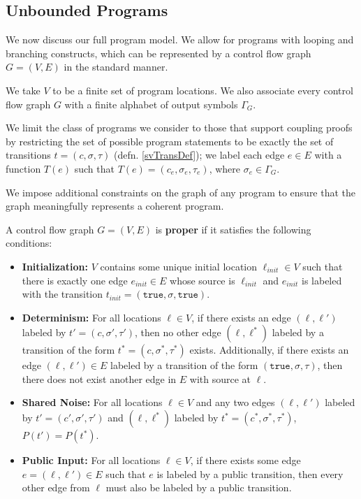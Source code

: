 
\subsection{Unbounded Programs}

We now discuss our full program model. We allow for programs with looping and branching constructs, which can be represented by a control flow graph $G = (V, E)$ in the standard manner. 

We take $V$ to be a finite set of program locations. We also associate every control flow graph $G$ with a finite alphabet of output symbols $\Gamma_G$.

We limit the class of programs we consider to those that support coupling proofs by restricting the set of possible program statements to be exactly the set of transitions $t = (c, \sigma, \tau)$ (defn. \ref{svTransDef}); we label each edge $e\in E$ with a function $T(e)$ such that $T(e) = (c_e, \sigma_e, \tau_e)$, where $\sigma_e \in \Gamma_G$. 

We impose additional constraints on the graph of any program to ensure that the graph meaningfully represents a coherent program.

\begin{defn}
    A control flow graph $G = (V, E)$ is \textbf{proper} if it satisfies the following conditions: 
    \begin{itemize}
        \item \textbf{Initialization:} $V$ contains some unique initial location $\ell_{init}\in V$ such that there is exactly one edge $e_{init}\in E$ whose source is $\ell_{init}$ and $e_{init}$ is labeled with the transition $t_{init} = (\texttt{true}, \sigma, \texttt{true})$.
        \item \textbf{Determinism:} For all locations $\ell\in V$, if there exists an edge $(\ell, \ell')$ labeled by $t'=(c, \sigma', \tau')$, then no other edge $(\ell, \ell^*)$ labeled by a transition of the form $t^* = (c, \sigma^*, \tau^*)$ exists. 
        Additionally, if there exists an edge $(\ell, \ell')\in E$ labeled by a transition of the form $(\texttt{true}, \sigma, \tau)$, then there does not exist another edge in $E$ with source at $\ell$.
        \item \textbf{Shared Noise:} For all locations $\ell\in V$ and any two edges $(\ell, \ell')$ labeled by $t'=(c', \sigma', \tau')$ and $(\ell, \ell^*)$ labeled by $t^* = (c^*, \sigma^*, \tau^*)$, $P(t') = P(t^*)$. 
        \item \textbf{Public Input:} For all locations $\ell\in V$, if there exists some edge $e = (\ell, \ell') \in E$ such that $e$ is labeled by a public transition, then every other edge from $\ell$ must also be labeled by a public transition. 
\end{itemize}
\end{defn}


